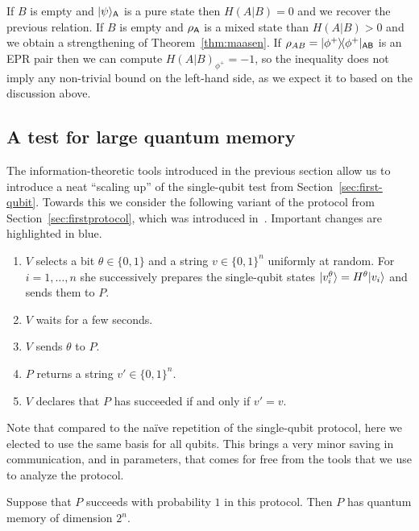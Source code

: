 If $B$ is empty and $|\psi\rangle_{{\textsf{A}}}$ is a pure state then $H(A|B)=0$ and we recover the previous relation. If $B$ is empty and $\rho_{{\textsf{A}}}$ is a mixed state than $H(A|B)>0$ and we obtain a strengthening of Theorem~\ref{thm:maasen}. If $\rho_{AB} = |\phi^+\rangle\!\langle\phi^+|_{{\textsf{AB}}}$ is an EPR pair then we can compute $H(A|B)_{\phi^+} = -1$, so the inequality does not imply any non-trivial bound on the left-hand side, as we expect it to based on the discussion above. 



\subsection{A test for large quantum memory}

The information-theoretic tools introduced in the previous section allow us to introduce a neat ``scaling up'' of the single-qubit test from Section~\ref{sec:first-qubit}. Towards this we consider the following variant of the protocol from Section~\ref{sec:firstprotocol}, which was introduced in~\cite{chao2020quantum}. Important changes are highlighted in {\color{blue} blue}.  


\begin{enumerate}
\item $V$ selects a bit $\theta\in\{0,1\}$ and {\color{blue} a string $v\in\{0,1\}^n$} uniformly at random. For $i=1,\ldots,n$ she successively prepares the single-qubit states $|v_i^\theta\rangle = H^\theta |v_i\rangle$ and sends them to $P$. 
\item $V$ waits for a few seconds. 
\item $V$ sends $\theta$ to $P$. 
\item $P$ returns a {\color{blue} string $v'\in\{0,1\}^n$}. 
\item $V$ declares that $P$ has succeeded if and only if $v'=v$.
\end{enumerate}

Note that compared to the na\"ive repetition of the single-qubit protocol, here we elected to use the same basis for all qubits. This brings a very minor saving in communication, and in parameters, that comes for free from the tools that we use to analyze the protocol. 

\begin{lemma}\label{lem:qubit-test-n}
Suppose that $P$ succeeds with probability $1$ in this protocol. Then $P$ has quantum memory of dimension $2^n$.  
\end{lemma}

